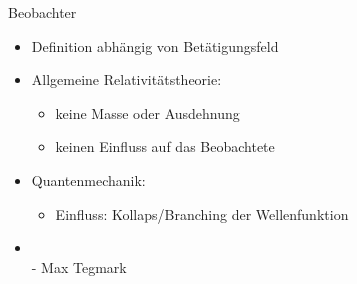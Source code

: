 \begin{frame}{Beobachter}
	\begin{itemize}
		\item{Definition abhängig von Betätigungsfeld}
		\item{Allgemeine Relativitätstheorie:}
		\begin{itemize}
			\item{keine Masse oder Ausdehnung}
			\item{keinen Einfluss auf das Beobachtete}
		\end{itemize}
		\item{Quantenmechanik:}
		\begin{itemize}
			\item{Einfluss: Kollaps/Branching der Wellenfunktion}
		\end{itemize}
		\item{\\ - Max Tegmark\,\cite{Tegmark_15_long}}
	\end{itemize}
\end{frame}